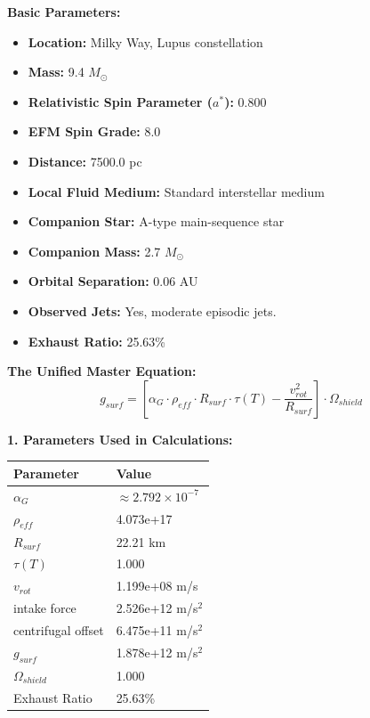 \documentclass[11pt, a4paper]{article}
\begin{document}
\vspace{0.5em}
\noindent \textbf{Basic Parameters:}
\begin{itemize}
  \item \textbf{Location:} Milky Way, Lupus constellation
  \item \textbf{Mass:} 9.4 $M_{\odot}$
  \item \textbf{Relativistic Spin Parameter ($a^*$):} 0.800
  \item \textbf{EFM Spin Grade:} 8.0
  \item \textbf{Distance:} 7500.0 pc
  \item \textbf{Local Fluid Medium:} Standard interstellar medium
  \item \textbf{Companion Star:} A-type main-sequence star
  \item \textbf{Companion Mass:} 2.7 $M_{\odot}$
  \item \textbf{Orbital Separation:} 0.06 AU
  \item \textbf{Observed Jets:} Yes, moderate episodic jets.
  \item \textbf{Exhaust Ratio:} 25.63\%
\end{itemize}

\vspace{0.5em}
\noindent \textbf{The Unified Master Equation:}
$$ g_{surf} = \left[ \alpha_G \cdot \rho_{eff} \cdot R_{surf} \cdot \tau(T) - \frac{v_{rot}^2}{R_{surf}} \right] \cdot \Omega_{shield} $$

\vspace{0.5em}
\noindent \textbf{1. Parameters Used in Calculations:}
\begin{center}
  \begin{tabular}{|l|l|}
    \hline
    \textbf{Parameter} & \textbf{Value} \\ \hline
    $\alpha_G$ & $\approx 2.792 \times 10^{-7}$ \\ \hline
    $\rho_{eff}$ & 4.073e+17 \\ \hline
    $R_{surf}$ & 22.21 km \\ \hline
    $\tau(T)$ & 1.000 \\ \hline
    $v_{rot}$ & 1.199e+08 m/s \\ \hline
    intake force & 2.526e+12 m/s$^2$ \\ \hline
    centrifugal offset & 6.475e+11 m/s$^2$ \\ \hline
    $g_{surf}$ & 1.878e+12 m/s$^2$ \\ \hline
    $\Omega_{shield}$ & 1.000 \\ \hline
    Exhaust Ratio & 25.63\% \\ \hline
  \end{tabular}
\end{center}
\end{document}
